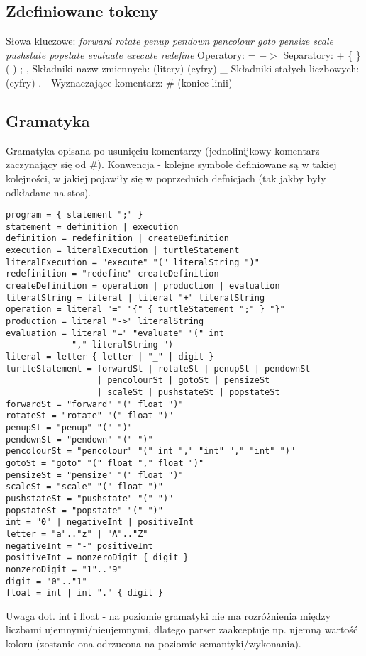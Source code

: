 \documentclass{article}
\begin{document}
\subsection{Zdefiniowane tokeny}
Słowa kluczowe:\newline
\textit{forward rotate penup pendown pencolour goto pensize scale pushstate popstate evaluate execute redefine }\newline
Operatory:\newline
= $-$$>$\newline 
Separatory:\newline
+ \{ \} ( ) ; ,\newline
Składniki nazw zmiennych:\newline
(litery) (cyfry) \_\newline
Składniki stałych liczbowych:\newline
(cyfry) . -\newline
Wyznaczające komentarz:\newline
\# (koniec linii)

\subsection{Gramatyka}
Gramatyka opisana po usunięciu komentarzy (jednolinijkowy komentarz zaczynający się od \#). Konwencja - kolejne symbole definiowane są w takiej kolejności, w jakiej pojawiły się w poprzednich defnicjach (tak jakby były odkładane na stos).
\begin{lstlisting}
program = { statement ";" }
statement = definition | execution
definition = redefinition | createDefinition
execution = literalExecution | turtleStatement
literalExecution = "execute" "(" literalString ")"
redefinition = "redefine" createDefinition
createDefinition = operation | production | evaluation
literalString = literal | literal "+" literalString
operation = literal "=" "{" { turtleStatement ";" } "}"
production = literal "->" literalString
evaluation = literal "=" "evaluate" "(" int
             "," literalString ")
literal = letter { letter | "_" | digit }
turtleStatement = forwardSt | rotateSt | penupSt | pendownSt  
                  | pencolourSt | gotoSt | pensizeSt
                  | scaleSt | pushstateSt | popstateSt
forwardSt = "forward" "(" float ")"
rotateSt = "rotate" "(" float ")"
penupSt = "penup" "(" ")"
pendownSt = "pendown" "(" ")"
pencolourSt = "pencolour" "(" int "," "int" "," "int" ")"
gotoSt = "goto" "(" float "," float ")"
pensizeSt = "pensize" "(" float ")"
scaleSt = "scale" "(" float ")"
pushstateSt = "pushstate" "(" ")"
popstateSt = "popstate" "(" ")"
int = "0" | negativeInt | positiveInt 
letter = "a".."z" | "A".."Z"
negativeInt = "-" positiveInt
positiveInt = nonzeroDigit { digit }
nonzeroDigit = "1".."9"
digit = "0".."1"
float = int | int "." { digit }

\end{lstlisting}
Uwaga dot. int i float - na poziomie gramatyki nie ma rozróżnienia między liczbami ujemnymi/nieujemnymi, dlatego parser zaakceptuje np. ujemną wartość koloru (zostanie ona odrzucona na poziomie semantyki/wykonania).
\end{document}
